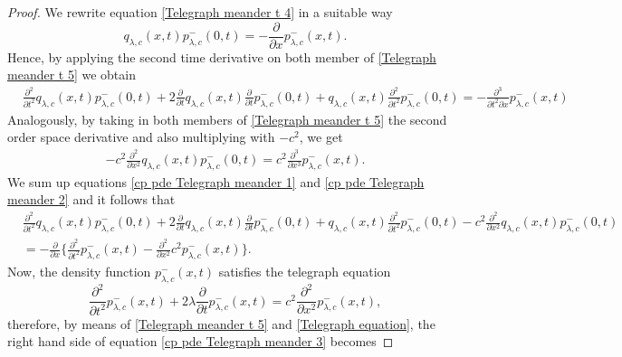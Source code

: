 \documentclass{article}
\theoremstyle{definition}
\numberwithin{equation}{section}
\begin{document}
\begin{proof}
We rewrite equation \eqref{Telegraph meander t 4} in a suitable way
\begin{equation}\label{Telegraph meander t 5}
q_{\lambda,c}(x,t)p^{-}_{\lambda,c}(0,t) = -\frac{\partial}{\partial x}p^{-}_{\lambda,c}(x,t).
\end{equation}
Hence, by applying the second time derivative on both member of \eqref{Telegraph meander t 5} we obtain
\begin{align}\label{cp pde Telegraph meander 1}
&\frac{\partial^2}{\partial t^2}q_{\lambda,c}(x,t)p^{-}_{\lambda,c}(0,t)+2\frac{\partial}{\partial t}q_{\lambda,c}(x,t)\frac{\partial}{\partial t}p^{-}_{\lambda,c}(0,t)+q_{\lambda,c}(x,t)\frac{\partial^2}{\partial t^2}p^{-}_{\lambda,c}(0,t) =-\frac{\partial^3}{\partial t^2\partial x}p^{-}_{\lambda,c}(x,t)
\end{align}
Analogously, by taking in both members of \eqref{Telegraph meander t 5} the second order space derivative and also multiplying with $-c^2$, we get
\begin{align}\label{cp pde Telegraph meander 2}
-c^2\frac{\partial^2}{\partial x^2}q_{\lambda,c}(x,t)p^{-}_{\lambda,c}(0,t) = c^2\frac{\partial^3}{\partial x^3}p^{-}_{\lambda,c}(x,t).
\end{align}
We sum up equations \eqref{cp pde Telegraph meander 1} and \eqref{cp pde Telegraph meander 2} and it follows that
\begin{align}\label{cp pde Telegraph meander 3}
&\frac{\partial^2}{\partial t^2}q_{\lambda,c}(x,t)p^{-}_{\lambda,c}(0,t)+2\frac{\partial}{\partial t}q_{\lambda,c}(x,t)\frac{\partial}{\partial t}p^{-}_{\lambda,c}(0,t)+q_{\lambda,c}(x,t)\frac{\partial^2}{\partial t^2}p^{-}_{\lambda,c}(0,t) -c^2\frac{\partial^2}{\partial x^2}q_{\lambda,c}(x,t)p^{-}_{\lambda,c}(0,t)\nonumber\\&=-\frac{\partial}{\partial x}\Big\{\frac{\partial^2}{\partial t^2}p^{-}_{\lambda,c}(x,t)-\frac{\partial^2}{\partial x^2}c^2p^{-}_{\lambda,c}(x,t)\Big\}.
\end{align}
Now, the density function $p^{-}_{\lambda,c}(x,t)$ satisfies the telegraph equation
\begin{equation}\label{Telegraph equation}
\frac{\partial^2}{\partial t^2}p^{-}_{\lambda,c}(x,t) +2\lambda\frac{\partial}{\partial t}p^{-}_{\lambda,c}(x,t) =c^2\frac{\partial^2}{\partial x^2}p^{-}_{\lambda,c}(x,t),
\end{equation}
therefore, by means of \eqref{Telegraph meander t 5} and \eqref{Telegraph equation}, the right hand side of equation \eqref{cp pde Telegraph meander 3} becomes 

\end{proof}
\end{document}
